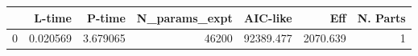 \begin{tabular}{lrrrrrr}
\toprule
{} &    L-time &    P-time &  N\_params\_expt &   AIC-like &       Eff &  N. Parts \\
\midrule
0 &  0.020569 &  3.679065 &          46200 &  92389.477 &  2070.639 &         1 \\
\bottomrule
\end{tabular}
